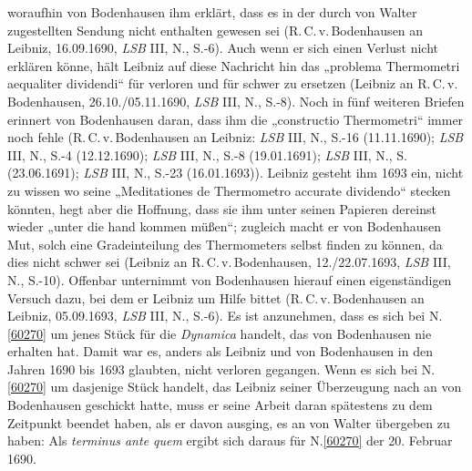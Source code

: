 woraufhin von Bodenhausen ihm erklärt, dass es in der durch von Walter zugestellten Sendung nicht enthalten gewesen sei (R.\,C.\,v.\,Bodenhausen an Leibniz, 16.09.1690,\cite{01535} \textit{LSB} III, N., S.-6). 
Auch wenn er sich einen Verlust nicht erklären könne, hält Leibniz auf diese Nachricht hin das „problema Thermometri aequaliter dividendi“ für verloren und für schwer zu ersetzen (Leibniz an R.\,C.\,v.\,Bodenhausen, 26.10./05.11.1690, \textit{LSB} III, N.\cite{02132}, S.-8). Noch in fünf weiteren Briefen erinnert von Bodenhausen daran, dass ihm die „constructio Thermometri“ immer noch fehle (R.\,C.\,v.\,Bodenhausen an Leibniz:  \textit{LSB} III, N., S.-16 (11.11.1690)\cite{01530}; \textit{LSB} III, N., S.-4 (12.12.1690)\cite{01531}; \textit{LSB} III, N., S.-8 (19.01.1691)\cite{01532}; \textit{LSB} III, N., S. (23.06.1691)\cite{01394}; \textit{LSB} III, N., S.-23 (16.01.1693)\cite{01533}). Leibniz gesteht ihm 1693 ein, nicht zu wissen wo seine „Meditationes de Thermometro accurate dividendo“ stecken könnten, hegt aber die Hoffnung, dass sie ihm unter seinen Papieren dereinst wieder „unter die hand kommen müßen“; zugleich macht er von Bodenhausen Mut, solch eine Gradeinteilung des Thermometers selbst finden zu können, da dies nicht schwer sei (Leibniz an R.\,C.\,v.\,Bodenhausen, 12./22.07.1693,\cite{01529} \textit{LSB} III, N., S.-10). Offenbar unternimmt von Bodenhausen hierauf einen eigenständigen Versuch dazu, bei dem er Leibniz um Hilfe bittet (R.\,C.\,v.\,Bodenhausen an Leibniz, 05.09.1693,\cite{01534} \textit{LSB} III, N., S.-6).
\pend
\pstart
Es ist anzunehmen, dass es sich bei N.\;\ref{60270} um jenes Stück für die \textit{Dynamica}\cite{01354} handelt, das von Bodenhausen nie erhalten hat. Damit war es, anders als Leibniz und von Bodenhausen in den Jahren 1690 bis 1693 glaubten, nicht verloren gegangen. Wenn es sich bei N.\;\ref{60270}  um dasjenige Stück handelt, das Leibniz seiner Überzeugung nach an von Bodenhausen geschickt hatte, muss er seine Arbeit daran spätestens zu dem Zeitpunkt beendet haben, als er davon ausging, es an von Walter übergeben zu haben: Als \textit{terminus ante quem} ergibt sich daraus für N.\;\ref{60270} der 20. Februar 1690.
